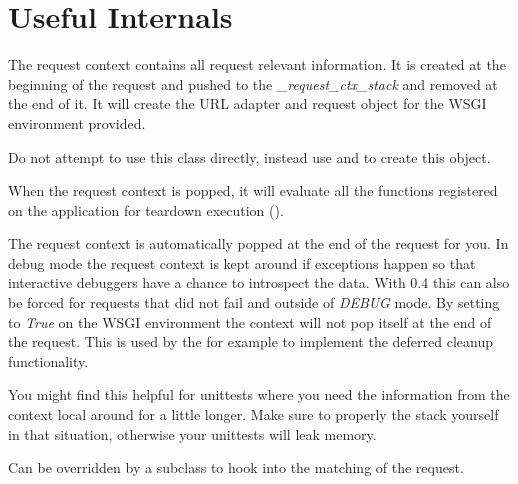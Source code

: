 \documentclass[a4paper,12pt]{sphinxmanual}
\begin{document}
\section{Useful Internals}
\label{api:useful-internals}

\begin{fulllineitems}
\label{api:flask.ctx.RequestContext}
The request context contains all request relevant information.  It is
created at the beginning of the request and pushed to the
\emph{\_request\_ctx\_stack} and removed at the end of it.  It will create the
URL adapter and request object for the WSGI environment provided.

Do not attempt to use this class directly, instead use
{\hyperref[api:flask.Flask.test_request_context]{}} and
{\hyperref[api:flask.Flask.request_context]{}} to create this object.

When the request context is popped, it will evaluate all the
functions registered on the application for teardown execution
({\hyperref[api:flask.Flask.teardown_request]{}}).

The request context is automatically popped at the end of the request
for you.  In debug mode the request context is kept around if
exceptions happen so that interactive debuggers have a chance to
introspect the data.  With 0.4 this can also be forced for requests
that did not fail and outside of \emph{DEBUG} mode.  By setting
 to \emph{True} on the WSGI environment the
context will not pop itself at the end of the request.  This is used by
the {\hyperref[api:flask.Flask.test_client]{}} for example to implement the
deferred cleanup functionality.

You might find this helpful for unittests where you need the
information from the context local around for a little longer.  Make
sure to properly  the stack yourself in
that situation, otherwise your unittests will leak memory.

\begin{fulllineitems}
\label{api:flask.ctx.RequestContext.match_request}
Can be overridden by a subclass to hook into the matching
of the request.


\end{fulllineitems}
\end{fulllineitems}
\end{document}

